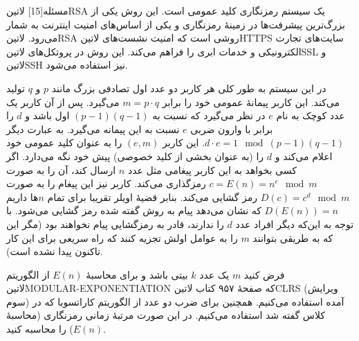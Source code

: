 ‌مسئله[15]
‌لاتین{RSA}
 یک سیستم رمزنگاری کلید عمومی است. این روش یکی از بزرگ‌ترین پیشرفت‌ها در زمینهٔ رمزنگاری و یکی از اساس‌های امنیت اینترنت به شمار می‌رود. ‌لاتین{RSA} روشی است که امنیت نشست‌های ‌لاتین{HTTPS} سایت‌های تجارت الکترونیکی و خدمات ابری را فراهم می‌کند. این روش  در پروتکل‌های ‌لاتین{SSL} و ‌لاتین{SSH} نیز استفاده می‌شود.

در این سیستم به طور کلی هر کاربر دو عدد اول تصادفی بزرگ مانند $p$ و $q$ تولید می‌کند. این کاربر پیمانۀ عمومی خود را برابر $m = p \cdot q$ می‌گیرد. پس از آن کاربر یک عدد کوچک به نام $e$ در نظر می‌گیرد که نسبت  به 
$(p-1)(q-1)$
اول باشد و $d$ را برابر با وارون ضربی $e$ نسبت به این پیمانه می‌گیرد. به عبارت دیگر 
$d\cdot e = 1 \mod (p-1)(q-1)$. این کاربر $(e,m)$ را به عنوان کلید عمومی خود اعلام می‌کند و $d$ را (به عنوان بخشی از کلید خصوصی) پیش خود نگه می‌دارد. اگر کسی بخواهد به این کاربر پیغامی مثل عدد $n$ ارسال کند، آن را به صورت 
$c = E(n) = n^e \mod m$
رمزگذاری می‌کند. کاربر نیز این پیغام را به صورت  $D(c) = c^d \mod m$ رمز گشایی می‌کند. بنابر قضیۀ اویلر تقریبا برای تمام $n$ها داریم 
$D(E(n)) = n$
که نشان می‌دهد پیام به روش گفته شده رمز گشایی می‌شود. با توجه به این‌که دیگر افراد عدد $d$ را ندارند، قادر به رمزگشایی پیام نخواهند بود (مگر این که به طریقی بتوانند $m$ را به عوامل اولش تجزیه کنند که راه سریعی برای این کار تاکنون پیدا نشده است).


\sloppy
فرض کنید $m$ یک عدد $k$ بیتی باشد و برای محاسبۀ $E(n)$ از الگوریتم ‌لاتین{MODULAR-EXPONENTIATION} که صفحۀ ۹۵۷ کتاب ‌لاتین{CLRS} (ویرایش سوم) آمده استفاده می‌کنیم. همچنین برای ضرب دو عدد از الگوریتم کاراتسوبا که در کلاس گفته شد استفاده می‌کنیم. در این صورت مرتبۀ زمانی رمزنگاری (محاسبۀ $E(n)$) را محاسبه کنید.




